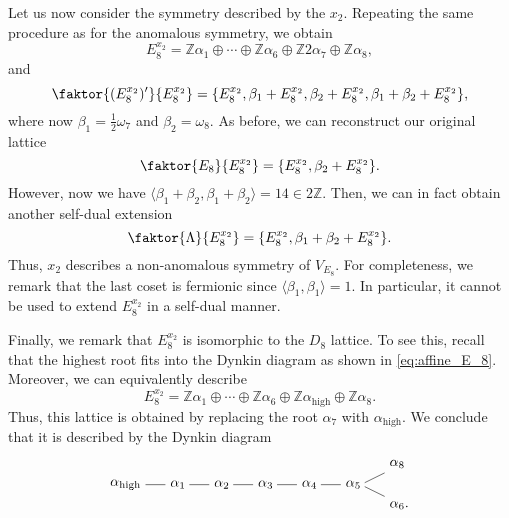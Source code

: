 \documentclass{article}
\begin{document}
Let us now consider the symmetry described by the $x_2$. Repeating the same procedure as for the anomalous symmetry, we obtain
\begin{equation}
    E_8^{x_2}=\mathbb{Z}\alpha_1\oplus\cdots\oplus\mathbb{Z}\alpha_6\oplus\mathbb{Z}2\alpha_7\oplus\mathbb{Z}\alpha_8,
\end{equation}
and
\begin{equation}
    \faktor{(E_8^{x_2})'}{E_8^{x_2}}=\{E_8^{x_2},\beta_1+E_8^{x_2},\beta_2+E_8^{x_2},\beta_1+\beta_2+E_8^{x_2}\},
\end{equation}
where now $\beta_1=\frac{1}{2}\omega_7$ and $\beta_2=\omega_8$. As before, we can reconstruct our original lattice
\begin{equation}
    \faktor{E_8}{E_8^{x_2}}=\{E_8^{x_2},\beta_2+E_8^{x_2}\}.
\end{equation}
However, now we have $\langle\beta_1+\beta_2,\beta_1+\beta_2\rangle=14\in2\mathbb{Z}$. Then, we can in fact obtain another self-dual extension 
\begin{equation}
    \faktor{\Lambda}{E_8^{x_2}}=\{E_8^{x_2},\beta_1+\beta_2+E_8^{x_2}\}.
\end{equation}
Thus, $x_2$ describes a non-anomalous symmetry of $V_{E_8}$. For completeness, we remark that the last coset is fermionic since $\langle \beta_1,\beta_1\rangle=1$. In particular, it cannot be used to extend $E_8^{x_2}$ in a self-dual manner.


Finally, we remark that $E_8^{x_2}$ is isomorphic to the $D_8$ lattice. To see this, recall that the highest root fits into the Dynkin diagram as shown in \eqref{eq:affine_E_8}. Moreover, we can equivalently describe
\begin{equation}
    E_8^{x_2}=\mathbb{Z}\alpha_1\oplus\cdots\oplus\mathbb{Z}\alpha_6\oplus\mathbb{Z}\alpha_{\text{high}}\oplus\mathbb{Z}\alpha_8.
\end{equation}
Thus, this lattice is obtained by replacing the root $\alpha_7$ with $\alpha_{\text{high}}$. We conclude that it is described by the Dynkin diagram
\begin{equation}
    \begin{tikzpicture}
    \draw (0,0) node {$\alpha_{\text{high}}$};
    \draw (0.5,0) -- (1,0) node [anchor = west] {$\alpha_1$};
    \draw (1.6,0) -- (2.1,0) node [anchor = west] {$\alpha_2$};
    \draw (2.7,0) -- (3.2,0) node [anchor = west] {$\alpha_3$};
    \draw (3.8,0) -- (4.3,0) node [anchor = west] {$\alpha_4$};
    \draw (4.9,0) -- (5.4,0) node [anchor = west] {$\alpha_5$};
    \draw (6,-0.05) -- (6.5,-0.3) node [anchor = north west] {$\alpha_6$.};
    \draw (6,0.05) -- (6.5,0.3) node [anchor = south west] {$\alpha_8$}; 
    \end{tikzpicture}
\end{equation}
\end{document}
